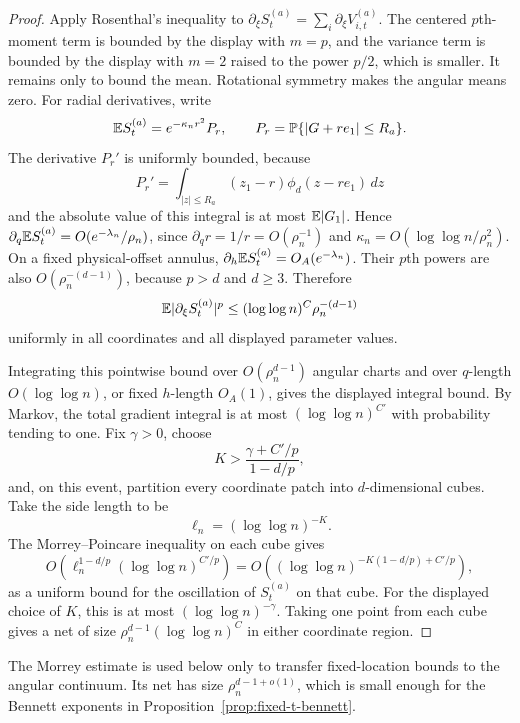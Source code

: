 \begin{proof}
Apply Rosenthal's inequality to
\(\partial_\xi S_t^{(a)}=\sum_i\partial_\xi V_{i,t}^{(a)}\).  The centered
\(p\)th-moment term is bounded by the display with \(m=p\), and the variance
term is bounded by the display with \(m=2\) raised to the power \(p/2\),
which is smaller.  It remains only to bound the mean.  Rotational symmetry
makes the angular means zero.  For radial derivatives, write
\[
    \mathbb E S_t^{(a)}=e^{-\kappa_nr^2}P_r,\qquad
    P_r=\mathbb P\{|G+re_1|\le R_a\}.
\]
The derivative \(P_r'\) is uniformly bounded, because
\[
    P_r'=\int_{|z|\le R_a}(z_1-r)\phi_d(z-re_1)\,dz
\]
and the absolute value of this integral is at most \(\mathbb E|G_1|\).  Hence
\(\partial_q\mathbb E S_t^{(a)}=O(e^{-\lambda_n}/\rho_n)\), since
\(\partial_q r=1/r=O(\rho_n^{-1})\) and
\(\kappa_n=O(\log\log n/\rho_n^2)\).  On a fixed physical-offset annulus,
\(\partial_h\mathbb E S_t^{(a)}=O_A(e^{-\lambda_n})\).  Their \(p\)th powers are
also \(O(\rho_n^{-(d-1)})\), because \(p>d\) and \(d\ge3\).  Therefore
\[
    \mathbb E|\partial_\xi S_t^{(a)}|^p
    \le(\log\log n)^C\rho_n^{-(d-1)}
\]
uniformly in all coordinates and all displayed parameter values.

Integrating this pointwise bound over \(O(\rho_n^{d-1})\) angular charts and
over \(q\)-length \(O(\log\log n)\), or fixed \(h\)-length \(O_A(1)\), gives
the displayed integral bound.  By Markov, the total gradient integral is at
most \((\log\log n)^{C'}\) with probability tending to one.  Fix
\(\gamma>0\), choose
\[
    K>\frac{\gamma+C'/p}{1-d/p},
\]
and, on this event, partition every coordinate patch into \(d\)-dimensional
cubes.  Take the side length to be
\[
    \ell_n=(\log\log n)^{-K}.
\]
The Morrey--Poincare inequality on each cube gives
\[
    O\!\left(\ell_n^{1-d/p}(\log\log n)^{C'/p}\right)
    =
    O\!\left((\log\log n)^{-K(1-d/p)+C'/p}\right),
\]
as a uniform bound for the oscillation of \(S_t^{(a)}\) on that cube.  For
the displayed choice of \(K\), this is at most
\((\log\log n)^{-\gamma}\).  Taking one point from each cube gives a net of
size \(\rho_n^{d-1}(\log\log n)^C\) in either coordinate region.
\end{proof}

The Morrey estimate is used below only to transfer fixed-location bounds to
the angular continuum. Its net has size \(\rho_n^{d-1+o(1)}\), which is small
enough for the Bennett exponents in Proposition~\ref{prop:fixed-t-bennett}.

